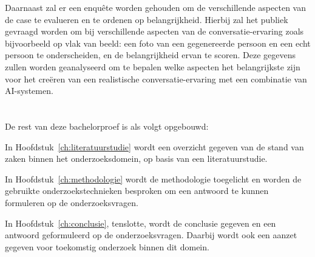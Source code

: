Daarnaast zal er een enquête worden gehouden om de verschillende aspecten van de case te evalueren en te ordenen op belangrijkheid. 
Hierbij zal het publiek gevraagd worden om bij verschillende aspecten van de conversatie-ervaring zoals bijvoorbeeld op vlak van beeld: een foto van een gegenereerde persoon en een echt persoon te onderscheiden, en de belangrijkheid ervan te scoren. Deze gegevens zullen worden geanalyseerd om te bepalen welke aspecten het belangrijkste zijn voor het creëren van een realistische conversatie-ervaring met een combinatie van AI-systemen.

\section{}
\label{sec:opzet-bachelorproef}


De rest van deze bachelorproef is als volgt opgebouwd:

In Hoofdstuk~\ref{ch:literatuurstudie} wordt een overzicht gegeven van de stand van zaken binnen het onderzoeksdomein, op basis van een literatuurstudie.

In Hoofdstuk~\ref{ch:methodologie} wordt de methodologie toegelicht en worden de gebruikte onderzoekstechnieken besproken om een antwoord te kunnen formuleren op de onderzoeksvragen.


In Hoofdstuk~\ref{ch:conclusie}, tenslotte, wordt de conclusie gegeven en een antwoord geformuleerd op de onderzoeksvragen. Daarbij wordt ook een aanzet gegeven voor toekomstig onderzoek binnen dit domein.